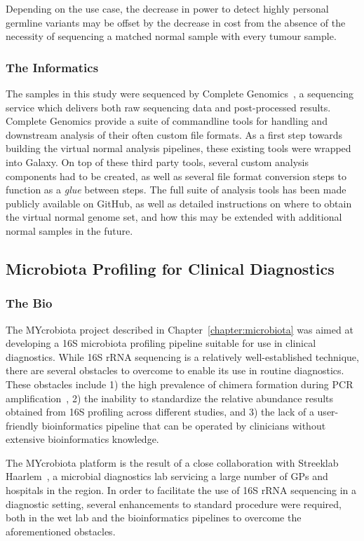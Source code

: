 Depending on the use case, the decrease in power to detect highly personal germline variants may be offset by the decrease in cost from the absence of the necessity of sequencing a matched normal sample with every tumour sample.

\subsubsection{The Informatics}
The samples in this study were sequenced by Complete Genomics~\cite{drmanac}, a sequencing service which delivers both raw sequencing data and post-processed results. Complete Genomics provide a suite of commandline tools for handling and downstream analysis of their often custom file formats. As a first step towards building the virtual normal analysis pipelines, these existing tools were wrapped into Galaxy. On top of these third party tools, several custom analysis components had to be created, as well as several file format conversion steps to function as a \emph{glue} between steps. The full suite of analysis tools has been made publicly available on GitHub, as well as detailed instructions on where to obtain the virtual normal genome set, and how this may be extended with additional normal samples in the future.


\subsection{Microbiota Profiling for Clinical Diagnostics}
\subsubsection{The Bio}
The MYcrobiota project described in Chapter~\ref{chapter:microbiota} was aimed at developing a 16S microbiota profiling pipeline suitable for use in clinical diagnostics. While 16S rRNA sequencing is a relatively well-established technique, there are several obstacles to overcome to enable its use in routine diagnostics. These obstacles include 1) the high prevalence of chimera formation during PCR amplification~\cite{huttenhower2012structure}, 2) the inability to standardize the relative abundance results obtained from 16S profiling across different studies, and 3) the lack of a user-friendly bioinformatics pipeline that can be operated by clinicians without extensive bioinformatics knowledge.

The MYcrobiota platform is the result of a close collaboration with Streeklab Haarlem~\cite{url-streeklab}, a microbial diagnostics lab servicing a large number of GPs and hospitals in the region. In order to facilitate the use of 16S rRNA sequencing in a diagnostic setting, several enhancements to standard procedure were required, both in the wet lab and the bioinformatics pipelines to overcome the aforementioned obstacles.

